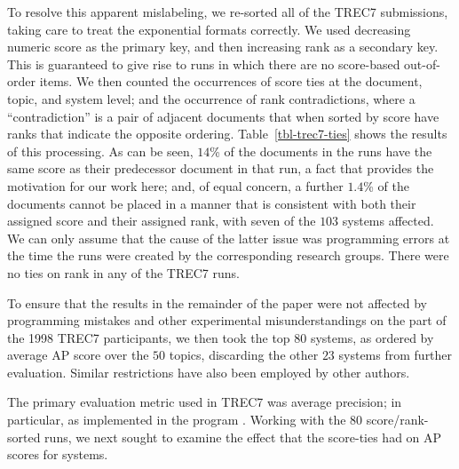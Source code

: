 To resolve this apparent mislabeling, we re-sorted all of the TREC7
submissions, taking care to treat the exponential formats correctly.
We used decreasing numeric score as the primary key, and then
increasing rank as a secondary key.
This is guaranteed to give rise to runs in which there are no
score-based out-of-order items.
We then counted the occurrences of score ties at the document, topic,
and system level; and the occurrence of rank contradictions, where a
``contradiction'' is a pair of adjacent documents that when sorted by
score have ranks that indicate the opposite ordering.
Table~\ref{tbl-trec7-ties} shows the results of this processing.
As can be seen, $14$\% of the documents in the runs have the same
score as their predecessor document in that run, a fact that provides
the motivation for our work here; and, of equal concern, a further
$1.4$\% of the documents cannot be placed in a manner that is
consistent with both their assigned score and their assigned rank,
with seven of the $103$ systems affected.
We can only assume that the cause of the latter issue was programming
errors at the time the runs were created by the corresponding
research groups.
There were no ties on rank in any of the TREC7 runs.

To ensure that the results in the remainder of the paper were not
affected by programming mistakes and other experimental
misunderstandings on the part of the 1998 TREC7 participants, we then
took the top $80$ systems, as ordered by average AP score over the
$50$ topics, discarding the other $23$ systems from further
evaluation.
Similar restrictions have also been employed by other authors.



The primary evaluation metric used in TREC7 was average precision; in
particular, as implemented in the program {\treceval}.
Working with the $80$ score/rank-sorted runs, we next sought to
examine the effect that the score-ties had on AP scores for systems.

